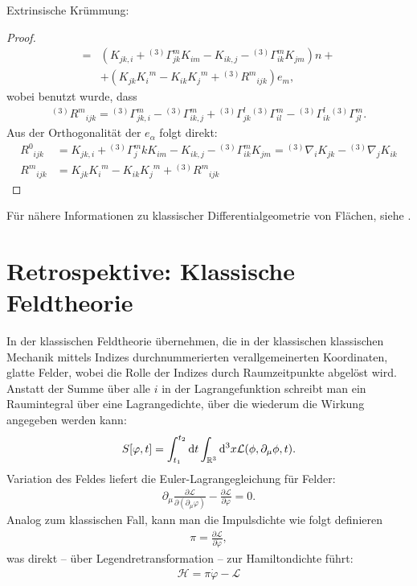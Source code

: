 \documentclass{scrartcl}
\newcommand{\inHS}{{}^{(3)}\!}
\begin{document}
\begin{paragraph}{Extrinsische Krümmung:}
\begin{proof}
\begin{align*}
										 =&(K_{jk,i}+\inHS\Gamma^m_{jk} K_{im}-K_{ik,j}-\inHS\Gamma^m_{ik}K_{jm})n+\\
										 &+(K_{jk}{K_i}^m-K_{ik}{K_j}^m+\inHS {R^m}_{ijk})e_m,
			\end{align*}
			wobei benutzt wurde, dass
			\begin{align*} 
				\inHS {R^m}_{ijk}=\inHS\Gamma^m_{jk,i}-\inHS\Gamma^m_{ik,j}+\inHS\Gamma^l_{jk}\inHS\Gamma^m_{il}-\inHS\Gamma^l_{ik}\inHS\Gamma^m_{jl}.
			\end{align*}
			Aus der Orthogonalität der $e_\alpha$ folgt direkt:
			\begin{align*}
				{R^0}_{ijk}&=K_{jk,i}+\inHS\Gamma^m_jk K_{im}-K_{ik,j}-\inHS\Gamma^m_{ik}K_{jm}=\inHS\nabla_i K_{jk}-\inHS\nabla_j K_{ik}\\
				{R^m}_{ijk}&=K_{jk}{K_i}^m-K_{ik}{K_j}^m+\inHS {R^m}_{ijk}
			\end{align*}
		\end{proof}
		Für nähere Informationen zu klassischer Differentialgeometrie von Flächen, siehe \cite{docarmo76}.
		\end{paragraph}
	\section{Retrospektive: Klassische Feldtheorie}
		In der klassischen Feldtheorie übernehmen, die in der klassischen klassischen
		Mechanik mittels Indizes durchnummerierten verallgemeinerten Koordinaten,
		glatte Felder, wobei die Rolle der Indizes durch Raumzeitpunkte abgelöst wird.
		Anstatt der Summe über alle $i$ in der Lagrangefunktion schreibt man ein
		Raumintegral über eine Lagrangedichte, über die wiederum die Wirkung angegeben werden
		kann:
		\begin{align}
			S[\varphi,t]=\int_{t_1}^{t_2}{\rm d}t\int_{\mathbb{R}^3}{\rm d}^3x \mathcal{L}(\phi,\partial_\mu \phi,t).
		\end{align}
		Variation des Feldes liefert die Euler-Lagrangegleichung für Felder:
		\begin{align}
			\partial_\mu \frac{\partial \mathcal{L}}{\partial (\partial_\mu \varphi)}-\frac{\partial \mathcal{L}}{\partial \varphi}=0.
		\end{align}
		Analog zum klassischen Fall, kann man die Impulsdichte wie folgt definieren
		\begin{align}
			\pi=\frac{\partial\mathcal{L}}{\partial \dot{\varphi}},
		\end{align}
		was direkt -- über Legendretransformation -- zur Hamiltondichte führt:
		\begin{align}
			\mathcal{H}=\pi\dot{\varphi}-\mathcal{L}
		\end{align}
\end{document}
